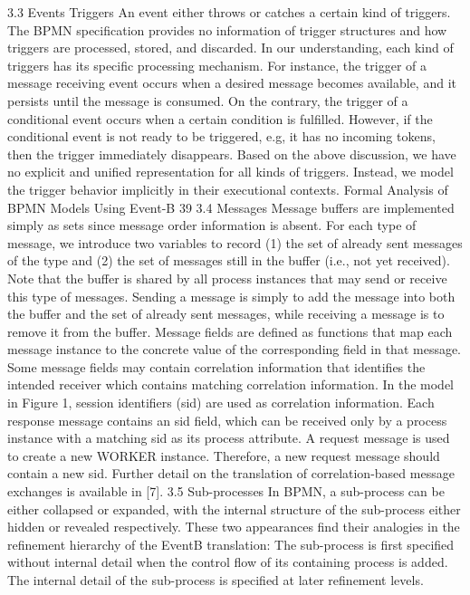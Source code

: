 3.3 Events Triggers
An event either throws or catches a certain kind of triggers. The BPMN specification provides no information of trigger structures and how triggers are processed, stored, and discarded. In our understanding, each kind of triggers has its
specific processing mechanism. For instance, the trigger of a message receiving
event occurs when a desired message becomes available, and it persists until the
message is consumed. On the contrary, the trigger of a conditional event occurs
when a certain condition is fulfilled. However, if the conditional event is not
ready to be triggered, e.g, it has no incoming tokens, then the trigger immediately disappears. Based on the above discussion, we have no explicit and unified
representation for all kinds of triggers. Instead, we model the trigger behavior
implicitly in their executional contexts.
Formal Analysis of BPMN Models Using Event-B 39
3.4 Messages
Message buffers are implemented simply as sets since message order information
is absent. For each type of message, we introduce two variables to record (1)
the set of already sent messages of the type and (2) the set of messages still in
the buffer (i.e., not yet received). Note that the buffer is shared by all process
instances that may send or receive this type of messages. Sending a message
is simply to add the message into both the buffer and the set of already sent
messages, while receiving a message is to remove it from the buffer. Message
fields are defined as functions that map each message instance to the concrete
value of the corresponding field in that message.
Some message fields may contain correlation information that identifies the
intended receiver which contains matching correlation information. In the model
in Figure 1, session identifiers (sid) are used as correlation information. Each
response message contains an sid field, which can be received only by a process
instance with a matching sid as its process attribute. A request message is
used to create a new WORKER instance. Therefore, a new request message should
contain a new sid. Further detail on the translation of correlation-based message
exchanges is available in [7].
3.5 Sub-processes
In BPMN, a sub-process can be either collapsed or expanded, with the internal structure of the sub-process either hidden or revealed respectively. These
two appearances find their analogies in the refinement hierarchy of the EventB translation: The sub-process is first specified without internal detail when
the control flow of its containing process is added. The internal detail of the
sub-process is specified at later refinement levels.
